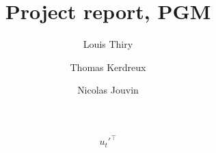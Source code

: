 \documentclass[11pt, oneside]{amsart}
\title[]{Project report, PGM}
\author[1]{Louis Thiry}
\author[2]{Thomas Kerdreux}
\author[3]{Nicolas Jouvin}
\begin{document}
\[ 
u_t'^{\top}
\]
\end{document}
